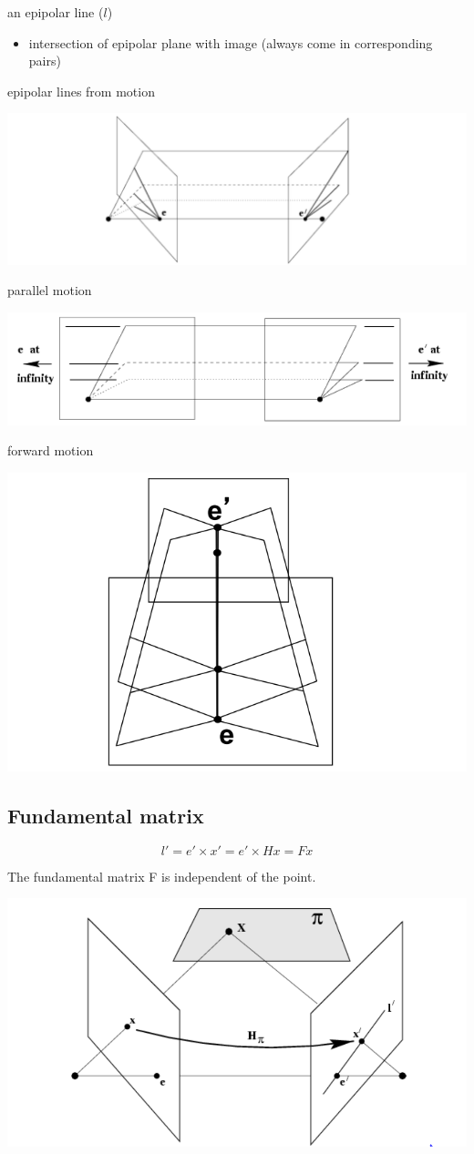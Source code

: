 an epipolar line ($l$) 
\begin{itemize}
	\item intersection of epipolar plane with image (always come in corresponding pairs)\\
\end{itemize}

epipolar lines from motion

\includegraphics[width=0.8\columnwidth]{pictures/motion}

parallel motion

\includegraphics[width=0.8\columnwidth]{pictures/parallelmotion}

forward motion

\includegraphics[width=0.4\columnwidth]{pictures/forwardmotion}

\subsection{Fundamental matrix}

$$l' = e' \times x' = e' \times Hx = Fx$$

The fundamental matrix F is independent of the point.

\includegraphics[width=\columnwidth]{pictures/epipolarplane3}

